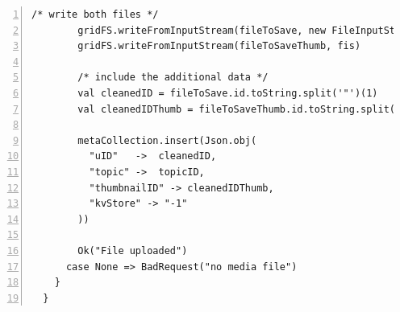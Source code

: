 \begin{lstlisting}[numbers=left,caption={Complete upload Action of the FileController},label=Scala:Upload:full,frame=tlbr,breaklines]
        /* write both files */
        gridFS.writeFromInputStream(fileToSave, new FileInputStream(newFile))
        gridFS.writeFromInputStream(fileToSaveThumb, fis)

        /* include the additional data */
        val cleanedID = fileToSave.id.toString.split('"')(1)
        val cleanedIDThumb = fileToSaveThumb.id.toString.split('"')(1)

        metaCollection.insert(Json.obj(
          "uID"   ->  cleanedID,
          "topic" ->  topicID,
          "thumbnailID" -> cleanedIDThumb,
          "kvStore" -> "-1"
        ))

        Ok("File uploaded")
      case None => BadRequest("no media file")
    }
  }
\end{lstlisting}
